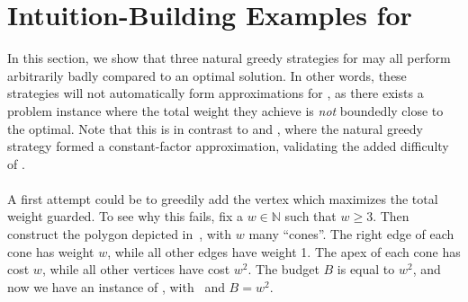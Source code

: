 \section{Intuition-Building Examples for \BMVVG{}}
In this section, we show that three natural greedy strategies for \BMVVG{} may all perform arbitrarily badly compared to an optimal solution. In other words, these strategies will not automatically form approximations for \BMVVG{}, as there exists a problem instance where the total weight they achieve is \emph{not} boundedly close to the optimal. Note that this is in contrast to \MLVG{} and \MVVG{}, where the natural greedy strategy formed a constant-factor approximation, validating the added difficulty of \BMVVG{}. \\\\
A first attempt could be to greedily add the vertex which maximizes the total weight guarded. To see why this fails, fix a $w\in\mathbb{N}$ such that $w\geq 3$. Then construct the polygon depicted in~, with $w$ many ``cones''. The right edge of each cone has weight $w$, while all other edges have weight 1. The apex of each cone has cost $w$, while all other vertices have cost $w^2$. The budget $B$ is equal to $w^2$, and now we have an instance of \BMVVG{}, with~ and $B=w^2$.
